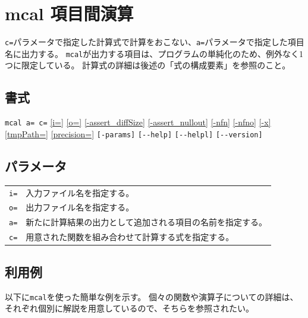 
%

\section{mcal 項目間演算\label{sect:mcal}}

\verb|c=|パラメータで指定した計算式で計算をおこない、\verb|a=|パラメータで指定した項目名に出力する。
\verb|mcal|が出力する項目は、プログラムの単純化のため、例外なく1つに限定している。
計算式の詳細は後述の「式の構成要素」を参照のこと。

\subsection*{書式}
\verb|mcal a= c=|
\hyperref[sect:option_i]{[i=]}
\hyperref[sect:option_o]{[o=]}
\hyperref[sect:option_assert_diffSize]{[-assert\_diffSize]}
\hyperref[sect:option_assert_nullout]{[-assert\_nullout]}
\hyperref[sect:option_nfn]{[-nfn]} 
\hyperref[sect:option_nfno]{[-nfno]}  
\hyperref[sect:option_x]{[-x]}
\hyperref[sect:option_option_tmppath]{[tmpPath=]}
\hyperref[sect:option_precision]{[precision=]}
\verb|[-params]|
\verb|[--help]|
\verb|[--helpl]|
\verb|[--version]|\\

\subsection*{パラメータ}
\begin{table}[hb]
{\small
\begin{tabular}{ll}
\verb|i=|    & 入力ファイル名を指定する。\\
\verb|o=|    & 出力ファイル名を指定する。\\
\verb|a=|    & 新たに計算結果の出力として追加される項目の名前を指定する。\\
\verb|c=|    & 用意された関数を組み合わせて計算する式を指定する。\\
\end{tabular} 
}
\end{table} 

\subsection*{利用例}
以下に\verb|mcal|を使った簡単な例を示す。
個々の関数や演算子についての詳細は、それぞれ個別に解説を用意しているので、そちらを参照されたい。

